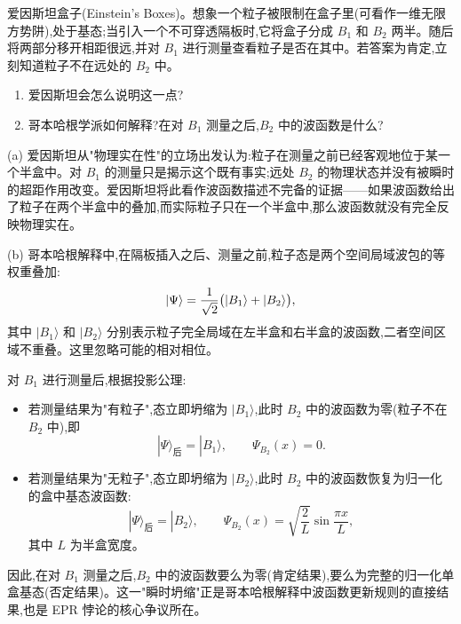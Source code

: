 \begin{question}
爱因斯坦盒子(Einstein's Boxes)。想象一个粒子被限制在盒子里(可看作一维无限方势阱),处于基态;当引入一个不可穿透隔板时,它将盒子分成 $B_1$ 和 $B_2$ 两半。随后将两部分移开相距很远,并对 $B_1$ 进行测量查看粒子是否在其中。若答案为肯定,立刻知道粒子不在远处的 $B_2$ 中。
\begin{enumerate}
\item 爱因斯坦会怎么说明这一点?
\item 哥本哈根学派如何解释?在对 $B_1$ 测量之后,$B_2$ 中的波函数是什么?
\end{enumerate}
\end{question}
\begin{solution}
(a) 爱因斯坦从"物理实在性"的立场出发认为:粒子在测量之前已经客观地位于某一个半盒中。对 $B_1$ 的测量只是揭示这个既有事实;远处 $B_2$ 的物理状态并没有被瞬时的超距作用改变。爱因斯坦将此看作波函数描述不完备的证据——如果波函数给出了粒子在两个半盒中的叠加,而实际粒子只在一个半盒中,那么波函数就没有完全反映物理实在。

(b) 哥本哈根解释中,在隔板插入之后、测量之前,粒子态是两个空间局域波包的等权重叠加:
\[
|\Psi\rangle={1\over\sqrt2}\bigl(|B_1\rangle+|B_2\rangle\bigr),
\]
其中 $|B_1\rangle$ 和 $|B_2\rangle$ 分别表示粒子完全局域在左半盒和右半盒的波函数,二者空间区域不重叠。这里忽略可能的相对相位。

对 $B_1$ 进行测量后,根据投影公理:
\begin{itemize}
\item 若测量结果为"有粒子",态立即坍缩为 $|B_1\rangle$,此时 $B_2$ 中的波函数为零(粒子不在 $B_2$ 中),即
\[
|\Psi\rangle_{\text{后}} = |B_1\rangle,\qquad \Psi_{B_2}(x)=0.
\]
\item 若测量结果为"无粒子",态立即坍缩为 $|B_2\rangle$,此时 $B_2$ 中的波函数恢复为归一化的盒中基态波函数:
\[
|\Psi\rangle_{\text{后}} = |B_2\rangle,\qquad \Psi_{B_2}(x) = \sqrt{\frac{2}{L}}\sin\frac{\pi x}{L},
\]
其中 $L$ 为半盒宽度。
\end{itemize}

因此,在对 $B_1$ 测量之后,$B_2$ 中的波函数要么为零(肯定结果),要么为完整的归一化单盒基态(否定结果)。这一"瞬时坍缩"正是哥本哈根解释中波函数更新规则的直接结果,也是 EPR 悖论的核心争议所在。
\end{solution}

